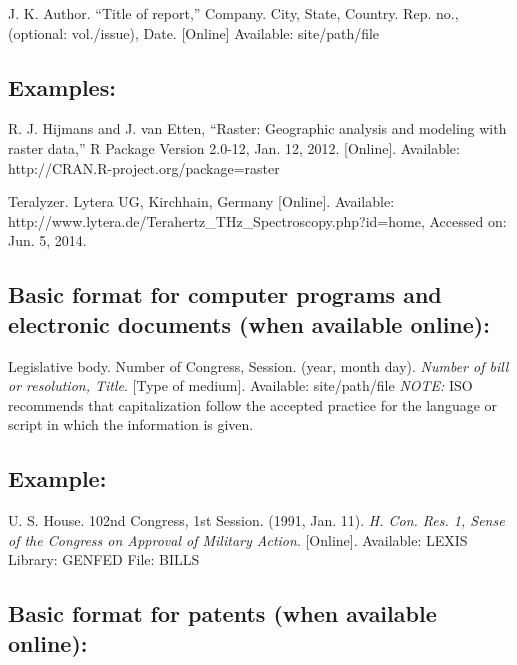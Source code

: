 \documentclass[journal]{IEEEtran}
\begin{document}
J. K. Author. ``Title of report,'' Company. City, State, Country. Rep. no., (optional: vol./issue), Date. [Online] Available: site/path/file 

\subsection*{Examples:}

\begin{thebibliography}{34}
\setcounter{enumiv}{17}

\bibitem{}R. J. Hijmans and J. van Etten, ``Raster: Geographic analysis and modeling with raster data,'' R Package Version 2.0-12, Jan. 12, 2012. [Online]. Available: http://CRAN.R-project.org/package=raster 

\bibitem{}Teralyzer. Lytera UG, Kirchhain, Germany [Online]. Available: http://www.lytera.de/Terahertz\_THz\_Spectroscopy.php?id=home, Accessed on: Jun. 5, 2014.
\end{thebibliography}

\subsection*{Basic format for computer programs and electronic documents (when available online):}

Legislative body. Number of Congress, Session. (year, month day). {\em Number of bill or resolution, Title}. [Type of medium]. Available: site/path/file
{\em NOTE:} ISO recommends that capitalization follow the accepted practice for the language or script in which the information is given.

\subsection*{Example:}

\begin{thebibliography}{34}
\setcounter{enumiv}{19}

\bibitem{}U. S. House. 102nd Congress, 1st Session. (1991, Jan. 11). {\em H. Con. Res. 1, Sense of the Congress on Approval of Military Action}. [Online]. Available: LEXIS Library: GENFED File: BILLS 
\end{thebibliography}

\subsection*{Basic format for patents (when available online):}
\end{document}

